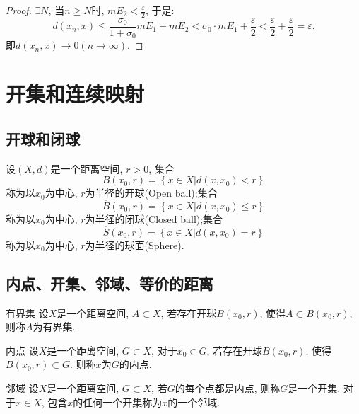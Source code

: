 \documentclass[lang=cn,10pt]{gorgeousnbook}
\numberwithin{equation}{section}%
\numberwithin{figure}{section}%
\begin{document}
\begin{proof}
$\exists N$, 当$n\ge N$时, $mE_2<\frac{\varepsilon}{2}$, 于是:
\begin{equation}
d\left( x_n,x \right) \le \frac{\sigma _0}{1+\sigma _0}mE_1+mE_2<\sigma _0\cdot mE_1+\frac{\varepsilon}{2}<\frac{\varepsilon}{2}+\frac{\varepsilon}{2}=\varepsilon. \nonumber
\end{equation}
即$d\left( x_n,x \right) \rightarrow 0 \left( n\rightarrow \infty \right)$.
\end{proof}
\section{开集和连续映射}
\subsection{开球和闭球}

\begin{definition}
设$(X,d)$是一个距离空间, $r>0$, 集合
\begin{equation}
  B(x_0,r)=\left\{x\in X\left| d(x,x_0)<r \right. \right\} \nonumber
\end{equation}
称为以$x_0$为中心, $r$为半径的开球(Open ball);集合
\begin{equation}
  \overline{B}(x_0,r)=\left\{x\in X\left| d(x,x_0)\leq r \right. \right\} \nonumber
\end{equation}
称为以$x_0$为中心, $r$为半径的闭球(Closed ball);集合
\begin{equation}
  \overline{S}(x_0,r)=\left\{x\in X\left| d(x,x_0)= r \right. \right\} \nonumber
\end{equation}
称为以$x_0$为中心, $r$为半径的球面(Sphere). 
\end{definition}

\subsection{内点、开集、邻域、等价的距离}
\begin{definition}{有界集}
设$X$是一个距离空间, $A\subset X$, 若存在开球$B(x_0,r)$, 使得$A\subset B(x_0,r)$, 则称$A$为有界集.
\end{definition}

\begin{definition}{内点}
设$X$是一个距离空间, $G\subset X$, 对于$x_0\in G$, 若存在开球$B(x_0,r)$, 使得$B(x_0,r)\subset G$. 则称$x$为$G$的内点. 
\end{definition}

\begin{definition}{邻域}
设$X$是一个距离空间, $G\subset X$, 若$G$的每个点都是内点, 则称$G$是一个开集. 对于$x\in X$, 包含$x$的任何一个开集称为$x$的一个邻域. 
\end{definition}
\end{document}
